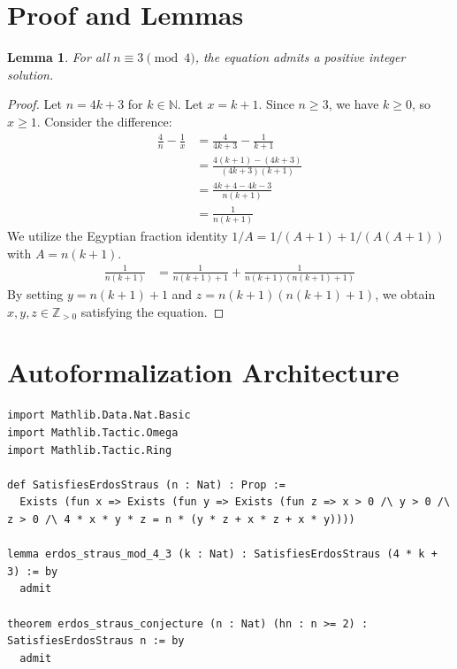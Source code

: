 \documentclass[12pt, a4paper]{article}
\newtheorem{lemma}[theorem]{Lemma}
\begin{document}
\section{Proof and Lemmas}
\begin{lemma}
For all $n \equiv 3 \pmod 4$, the equation admits a positive integer solution.
\end{lemma}
\begin{proof}
Let $n = 4k+3$ for $k \in \mathbb{N}$. Let $x = k+1$. Since $n \geq 3$, we have $k \geq 0$, so $x \geq 1$. Consider the difference:
\begin{align*}
\frac{4}{n} - \frac{1}{x} &= \frac{4}{4k+3} - \frac{1}{k+1} \\
&= \frac{4(k+1) - (4k+3)}{(4k+3)(k+1)} \\
&= \frac{4k+4 - 4k - 3}{n(k+1)} \\
&= \frac{1}{n(k+1)}
\end{align*}
We utilize the Egyptian fraction identity $1/A = 1/(A+1) + 1/(A(A+1))$ with $A = n(k+1)$.
\begin{align*}
\frac{1}{n(k+1)} &= \frac{1}{n(k+1) + 1} + \frac{1}{n(k+1)(n(k+1) + 1)}
\end{align*}
By setting $y = n(k+1)+1$ and $z = n(k+1)(n(k+1)+1)$, we obtain $x,y,z \in \mathbb{Z}_{>0}$ satisfying the equation.
\end{proof}

\section{Autoformalization Architecture}
\begin{lstlisting}[basicstyle=\ttfamily\small, breaklines=true]
import Mathlib.Data.Nat.Basic
import Mathlib.Tactic.Omega
import Mathlib.Tactic.Ring

def SatisfiesErdosStraus (n : Nat) : Prop :=
  Exists (fun x => Exists (fun y => Exists (fun z => x > 0 /\ y > 0 /\ z > 0 /\ 4 * x * y * z = n * (y * z + x * z + x * y))))

lemma erdos_straus_mod_4_3 (k : Nat) : SatisfiesErdosStraus (4 * k + 3) := by
  admit

theorem erdos_straus_conjecture (n : Nat) (hn : n >= 2) : SatisfiesErdosStraus n := by
  admit
\end{lstlisting}
\end{document}
